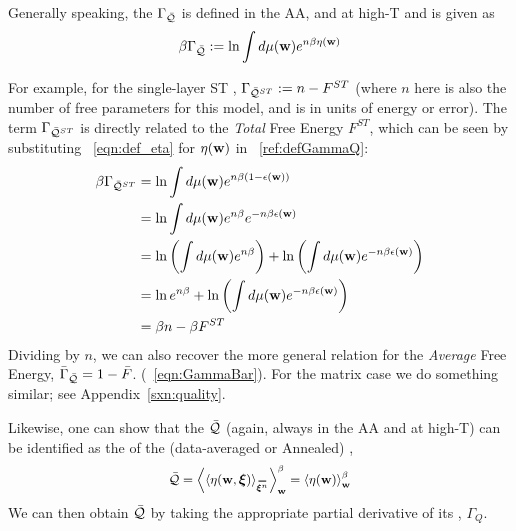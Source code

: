 Generally speaking, the \Quality \GeneratingFunction $\Gamma_{\bar{\mathcal{Q}}}$ is defined in the AA, and at high-T and is given as
\begin{align}
  \label{ref:defGammaQ}
  \beta\Gamma_{\bar{\mathcal{Q}}} := \ln\int d\mu({\mathbf{w}}) e^{n\beta\eta({\mathbf{w}})}
\end{align}

For example, for the single-layer ST \Perceptron, $\Gamma_{\bar{\mathcal{Q}}^{ST}}:=n-F^{ST}$
(where $n$ here is also the number of free parameters for this model, and is in units of energy or error).
The term $\Gamma_{\bar{\mathcal{Q}}^{ST}}$ is directly related to the \emph{Total} Free Energy $F^{ST}$, which can be seen by substituting \EQN~\ref{eqn:def_eta}
for $\eta({\mathbf{w}})$ in \EQN~\ref{ref:defGammaQ}:
\begin{align}
  \label{ref:defGammaQtoF}
  \beta\Gamma_{\bar{\mathcal{Q}}^{ST}}
  &= \ln\int d\mu({\mathbf{w}}) e^{n\beta(1-\epsilon({\mathbf{w}}))} \\ \nonumber
    &= \ln\int d\mu({\mathbf{w}}) e^{n\beta}e^{-n\beta\epsilon({\mathbf{w}})} \\ \nonumber
    &= \ln\left(\int d\mu({\mathbf{w}}) e^{n\beta}\right)+\ln\left(\int d\mu({\mathbf{w}})e^{-n\beta\epsilon({\mathbf{w}})}\right) \\ \nonumber
   &= \ln e^{n\beta}+\ln\left(\int d\mu({\mathbf{w}})e^{-n\beta\epsilon({\mathbf{w}})}\right) \\ \nonumber
  &= \beta n-\beta F^{ST}
\end{align}
Dividing by $n$, we can also recover the more general relation for the \emph{Average} Free Energy,
$\bar{\Gamma}_{\bar{\mathcal{Q}}}=1-\bar{F}$. (\EQN~\ref{eqn:GammaBar}).
For the matrix case we do something similar; see Appendix~\ref{sxn:quality}.

Likewise, one can show that the \Quality $\bar{\mathcal{Q}}$
(again, always in the AA and at high-T) can be identified as the \ThermalAverage of the (data-averaged or Annealed)
\SelfOverlap, 
\begin{align}
  \label{eqn:Q_def_eta}
  \Q = \THRMAVGw{\langle\ETA(\WVEC,\XI)\rangle_{\AVGNDXIn}} =\THRMAVGw{\ETA(\WVEC)}
\end{align}
We can then obtain $\bar{\mathcal{Q}}$ by taking the appropriate partial derivative of its \GeneratingFunction, $\Gamma_{Q}$.

